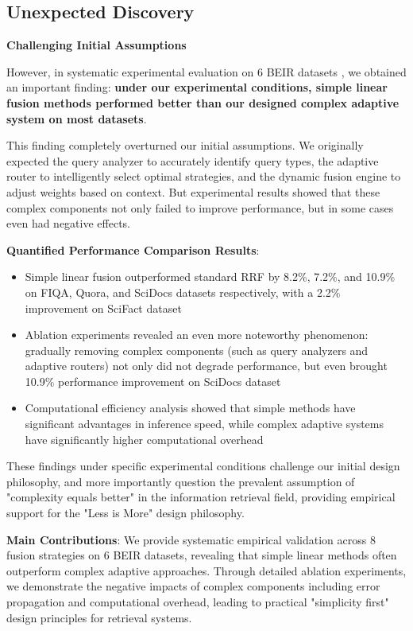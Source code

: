 \documentclass[letterpaper]{article} %
\begin{document}
\subsection{Unexpected Discovery}

\textbf{Challenging Initial Assumptions}

However, in systematic experimental evaluation on 6 BEIR datasets \cite{thakur2021beir}, we obtained an important finding: \textbf{under our experimental conditions, simple linear fusion methods performed better than our designed complex adaptive system on most datasets}.

This finding completely overturned our initial assumptions. We originally expected the query analyzer to accurately identify query types, the adaptive router to intelligently select optimal strategies, and the dynamic fusion engine to adjust weights based on context. But experimental results showed that these complex components not only failed to improve performance, but in some cases even had negative effects.

\textbf{Quantified Performance Comparison Results}:

\begin{itemize}
\item Simple linear fusion outperformed standard RRF by 8.2\%, 7.2\%, and 10.9\% on FIQA, Quora, and SciDocs datasets respectively, with a 2.2\% improvement on SciFact dataset\\
\item Ablation experiments revealed an even more noteworthy phenomenon: gradually removing complex components (such as query analyzers and adaptive routers) not only did not degrade performance, but even brought 10.9\% performance improvement on SciDocs dataset\\
\item Computational efficiency analysis showed that simple methods have significant advantages in inference speed, while complex adaptive systems have significantly higher computational overhead
\end{itemize}

These findings under specific experimental conditions challenge our initial design philosophy, and more importantly question the prevalent assumption of "complexity equals better" in the information retrieval field, providing empirical support for the "Less is More" design philosophy.

\textbf{Main Contributions}: We provide systematic empirical validation across 8 fusion strategies on 6 BEIR datasets, revealing that simple linear methods often outperform complex adaptive approaches. Through detailed ablation experiments, we demonstrate the negative impacts of complex components including error propagation and computational overhead, leading to practical "simplicity first" design principles for retrieval systems.
\end{document}
